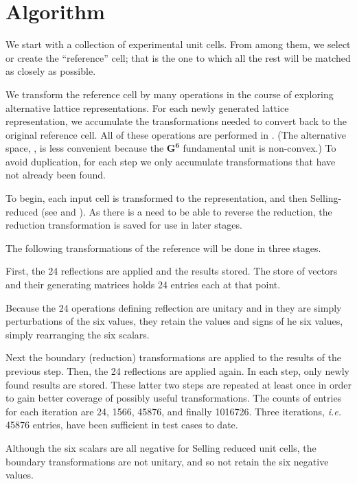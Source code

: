\documentclass[preprint]{iucr}              %
\numberwithin{equation}{section}
\numberwithin{equation}{section}
\begin{document}
	\section{Algorithm}
	
	We start with a collection of experimental unit cells. From among them, we select or create the
	``reference'' cell; that is the one to which all the rest will be matched as closely as possible.
	
	We transform the reference cell by many operations in the course of exploring alternative
	lattice representations. For each newly
	generated lattice representation, we accumulate the transformations needed to convert  back to the 
	original reference cell.  All of these operations are
	performed in \SVI{}. (The alternative space, \GVI{}, is less convenient
	because the $ \mathbf{G^6}$ fundamental unit is non-convex.) To avoid duplication, for each step 
	we only accumulate transformations
	that have not already been found. 
	
	To begin, each input cell is transformed to the \SVI{} representation, and then 
	Selling-reduced (see  and ). As
	there is a need to be able to reverse the reduction, the reduction transformation 
	is saved for use in later stages.
	
	The following transformations of the reference will be done in three stages.
	
	First, the 24 \SVI{} reflections are
	applied \cite{Andrews2019b} and the results stored. The store of \SVI{} vectors and their generating matrices holds 24 entries each at that point.
	
	Because the 24 operations defining reflection are unitary and
	in \SVI{} they are simply perturbations of the six values,
	they retain the values and signs of he six values, 
	simply rearranging the six scalars.
	
	
	Next the boundary (reduction) transformations \cite{Andrews2019b} are applied to
	the results of the previous step. Then, the 24 reflections are applied again. In
	each step, only newly found results are stored. These latter two steps are repeated 
	at least once in order to gain better coverage of possibly useful transformations. 
	The counts of entries for each iteration are 24, 1566, 45876, and finally 1016726.
	Three iterations, {\it i.e.} 45876 entries, have been sufficient in test cases to date.
	
	Although the six scalars are all negative for Selling
	reduced unit cells, the boundary transformations are
	not unitary, and so not retain the six negative values.
	
\end{document}
